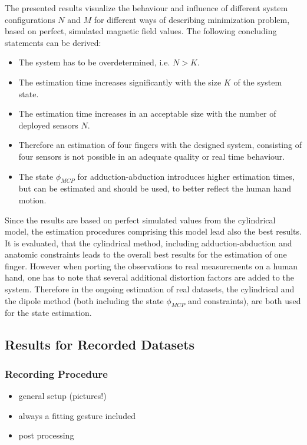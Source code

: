 The presented results visualize the behaviour and influence of different system configurations $ N $ and $ M $ for different ways of describing minimization problem, based on perfect, simulated magnetic field values. The following concluding statements can be derived:
\begin{itemize}
\item The system has to be overdetermined, i.e. $ N > K $.
\item The estimation time increases significantly with the size $ K $ of the system state.
\item The estimation time increases in an acceptable size with the number of deployed sensors $ N $.
\item Therefore an estimation of four fingers with the designed system, consisting of four sensors is not possible in an adequate quality or real time behaviour.
\item The state $ \phi_{MCP} $ for adduction-abduction introduces higher estimation times, but can be estimated and should be used, to better reflect the human hand motion.
\end{itemize}
Since the results are based on perfect simulated values from the cylindrical model, the estimation procedures comprising this model lead also the best results. It is evaluated, that the cylindrical method, including adduction-abduction and anatomic constraints leads to the overall best results for the estimation of one finger. However when porting the observations to real measurements on a human hand, one has to note that several additional distortion factors are added to the system. Therefore in the ongoing estimation of real datasets, the cylindrical and the dipole method (both including the state $ \phi_{MCP} $ and constraints), are both used for the state estimation.





\subsection{Results for Recorded Datasets} \label{subsec:resMeas}

\subsubsection{Recording Procedure}
	\begin{itemize}
	\item general setup (pictures!)
	\item always a fitting gesture included
	\item post processing
	\end{itemize}


